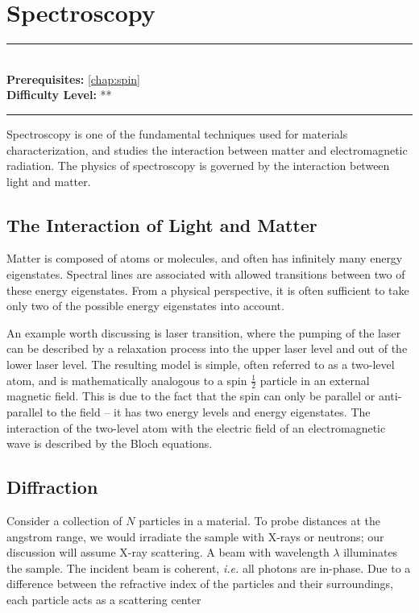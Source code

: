 \documentclass[book.tex]{subfiles}
\begin{document}
\chapter{Spectroscopy}

\label{chap:spectroscopy}
\noindent\rule{11cm}{0.4pt} \\
\textbf{Prerequisites:}  \autoref{chap:spin}  \\
\textbf{Difficulty Level:} ** \\
\noindent\rule{11cm}{0.4pt}
\vspace{5mm}

Spectroscopy is one of the fundamental techniques used for materials characterization, and studies the interaction between matter and electromagnetic radiation. The physics of spectroscopy is governed by the interaction between light and matter.

\section{The Interaction of Light and Matter}
Matter is composed of atoms or molecules, and often has infinitely many energy eigenstates. Spectral lines are associated with allowed transitions between two of these energy eigenstates. From a physical perspective, it is often sufficient to take only two of the possible energy eigenstates into account. 

An example worth discussing is laser transition, where the pumping of the laser can be described by a relaxation process into the upper laser level and out of the lower laser level. The resulting model is simple, often referred to as a two-level atom, and is mathematically analogous to a spin $\frac{1}{2}$ particle in an external magnetic field. This is due to the fact that the spin can only be
parallel or anti-parallel to the field -- it has two energy levels and energy eigenstates. The interaction of the two-level atom with the electric field of an electromagnetic wave is described by the Bloch equations.



\section{Diffraction}

Consider a collection of $N$ particles in a material. To probe distances at the angstrom range, we would irradiate the sample with X-rays or neutrons; our discussion will assume X-ray scattering. A beam with wavelength $\lambda$ illuminates the sample. The incident
beam is coherent, \textit{i.e.} all photons are in-phase. Due to a difference between the refractive index of the particles and their surroundings, each particle acts as a scattering center
\end{document}

